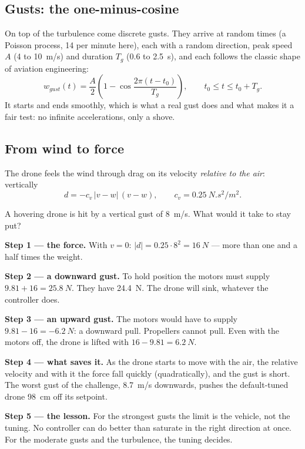 \subsection{Gusts: the one-minus-cosine}
On top of the turbulence come discrete gusts. They arrive at random times (a Poisson process, 14 per minute here), each with a random direction, peak speed $A$ (4 to \SI{10}{m/s}) and duration $T_g$ (0.6 to \SI{2.5}{s}), and each follows the classic shape of aviation engineering:
\begin{equation}
  w_{gust}(t) = \frac{A}{2}\left(1 - \cos\frac{2\pi(t - t_0)}{T_g}\right),\qquad t_0 \le t \le t_0 + T_g .
\end{equation}
It starts and ends smoothly, which is what a real gust does and what makes it a fair test: no infinite accelerations, only a shove.

\subsection{From wind to force}
The drone feels the wind through drag on its velocity \emph{relative to the air}: vertically
\begin{equation}\label{eq:challenge-drag}
  d = -c_v\,|v - w|\,(v - w), \qquad c_v = \SI{0.25}{N.s^2/m^2}.
\end{equation}

\begin{example}
\label{ex:challenge-force}
A hovering drone is hit by a vertical gust of \SI{8}{m/s}. What would it take to stay put?

\textbf{Step 1 — the force.} With $v = 0$: $|d| = 0.25 \cdot 8^2 = \SI{16}{N}$ — more than one and a half times the weight.

\textbf{Step 2 — a downward gust.} To hold position the motors must supply $9.81 + 16 = \SI{25.8}{N}$. They have \SI{24.4}{N}. The drone will sink, whatever the controller does.

\textbf{Step 3 — an upward gust.} The motors would have to supply $9.81 - 16 = \SI{-6.2}{N}$: a downward pull. Propellers cannot pull. Even with the motors off, the drone is lifted with $16 - 9.81 = \SI{6.2}{N}$.

\textbf{Step 4 — what saves it.} As the drone starts to move with the air, the relative velocity and with it the force fall quickly (quadratically), and the gust is short. The worst gust of the challenge, \SI{8.7}{m/s} downwards, pushes the default-tuned drone \SI{98}{cm} off its setpoint.

\textbf{Step 5 — the lesson.} For the strongest gusts the limit is the vehicle, not the tuning. No controller can do better than saturate in the right direction at once. For the moderate gusts and the turbulence, the tuning decides.
\end{example}

